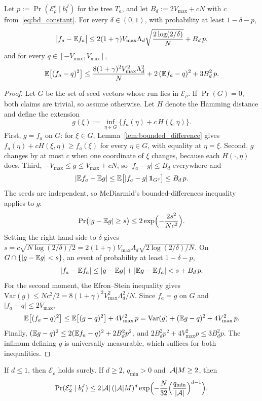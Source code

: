 \begin{lem}\label{lem:mc_fluctuation}
Let $p:=\Pr(\mathcal E_\rho^c\mid b_t^J)$ for the tree $T_a$, and let $B_d:=2V_{\max}+cN$ with $c$ from~\eqref{eq:bd_constant}.
For every $\delta\in(0,1)$, with probability at least $1-\delta-p$,
\[
\bigl|f_a-\mathbb{E} f_a\bigr|\le 2(1+\gamma)V_{\max}\Lambda_d\sqrt{\frac{2\log(2/\delta)}{N}}+B_d\,p,
\]
and for every $q\in[-V_{\max},V_{\max}]$,
\[
\mathbb{E}\bigl[(f_a-q)^2\bigr]\le\frac{8(1+\gamma)^2V_{\max}^2\Lambda_d^2}{N}+2\,(\mathbb{E} f_a-q)^2+3B_d^2\,p.
\]
\end{lem}

\begin{proof}
Let $G$ be the set of seed vectors whose run lies in $\mathcal E_\rho$.
If $\Pr(G)=0$, both claims are trivial, so assume otherwise.
Let $H$ denote the Hamming distance and define the extension
\[
g(\xi):=\inf_{\eta\in G}\bigl\{f_a(\eta)+c\,H(\xi,\eta)\bigr\}.
\]
First, $g=f_a$ on $G$: for $\xi\in G$, Lemma~\ref{lem:bounded_difference} gives $f_a(\eta)+cH(\xi,\eta)\ge f_a(\xi)$ for every $\eta\in G$, with equality at $\eta=\xi$.
Second, $g$ changes by at most $c$ when one coordinate of $\xi$ changes, because each $H(\cdot,\eta)$ does.
Third, $-V_{\max}\le g\le V_{\max}+cN$, so $|f_a-g|\le B_d$ everywhere and
\[
|\mathbb{E} f_a-\mathbb{E} g|\le\mathbb{E}\bigl[|f_a-g|\,\mathbf{1}_{G^c}\bigr]\le B_d\,p.
\]
The seeds are independent, so McDiarmid's bounded-differences inequality applies to $g$:
\[
\Pr\bigl(|g-\mathbb{E} g|\ge s\bigr)\le2\exp\Bigl(-\frac{2s^2}{Nc^2}\Bigr).
\]
Setting the right-hand side to $\delta$ gives $s=c\sqrt{N\log(2/\delta)/2}=2(1+\gamma)V_{\max}\Lambda_d\sqrt{2\log(2/\delta)/N}$.
On $G\cap\{|g-\mathbb{E} g|<s\}$, an event of probability at least $1-\delta-p$,
\[
|f_a-\mathbb{E} f_a|\le|g-\mathbb{E} g|+|\mathbb{E} g-\mathbb{E} f_a|<s+B_d\,p.
\]
For the second moment, the Efron--Stein inequality gives $\mathrm{Var}(g)\le Nc^2/2=8(1+\gamma)^2V_{\max}^2\Lambda_d^2/N$.
Since $f_a=g$ on $G$ and $|f_a-q|\le2V_{\max}$,
\[
\mathbb{E}\bigl[(f_a-q)^2\bigr]\le\mathbb{E}\bigl[(g-q)^2\bigr]+4V_{\max}^2\,p=\mathrm{Var}(g)+(\mathbb{E} g-q)^2+4V_{\max}^2\,p.
\]
Finally, $(\mathbb{E} g-q)^2\le2(\mathbb{E} f_a-q)^2+2B_d^2p^2$, and $2B_d^2p^2+4V_{\max}^2p\le3B_d^2p$.
The infimum defining $g$ is universally measurable, which suffices for both inequalities.
\end{proof}

\begin{lem}\label{lem:balance}
If $d\le1$, then $\mathcal E_\rho$ holds surely.
If $d\ge2$, $q_{\min}>0$ and $|{\mathcal{A}}|M\ge2$, then
\[
\Pr(\mathcal E_2^c\mid b_t^J)\le2|{\mathcal{A}}|\,(|{\mathcal{A}}|M)^d\exp\Bigl(-\frac{N}{32}\Bigl(\frac{q_{\min}}{|{\mathcal{A}}|}\Bigr)^{d-1}\Bigr).
\]
\end{lem}


